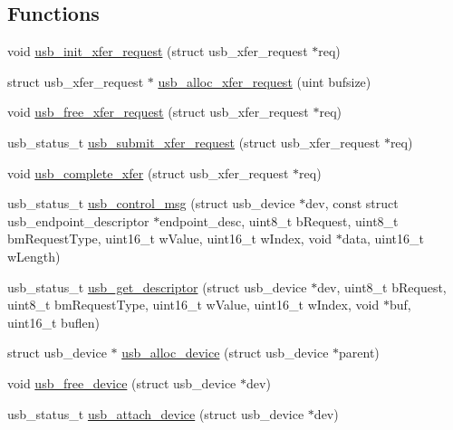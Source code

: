 \subsection*{Functions}
\begin{DoxyCompactItemize}
\item 
void \hyperlink{group__usbcore_ga04500240d93eaedb734240929e5a06be}{usb\-\_\-init\-\_\-xfer\-\_\-request} (struct usb\-\_\-xfer\-\_\-request $\ast$req)
\item 
struct usb\-\_\-xfer\-\_\-request $\ast$ \hyperlink{group__usbcore_ga7daf3baaa97a513d71f323d0f9391fb9}{usb\-\_\-alloc\-\_\-xfer\-\_\-request} (uint bufsize)
\item 
void \hyperlink{group__usbcore_ga4ef47c1a9b0707276d121214cdd461d0}{usb\-\_\-free\-\_\-xfer\-\_\-request} (struct usb\-\_\-xfer\-\_\-request $\ast$req)
\item 
usb\-\_\-status\-\_\-t \hyperlink{group__usbcore_ga873be6d448b1c95c51cb5600a197cf64}{usb\-\_\-submit\-\_\-xfer\-\_\-request} (struct usb\-\_\-xfer\-\_\-request $\ast$req)
\item 
void \hyperlink{group__usbcore_gabf82a9972b273a0e842212e2d638272b}{usb\-\_\-complete\-\_\-xfer} (struct usb\-\_\-xfer\-\_\-request $\ast$req)
\item 
usb\-\_\-status\-\_\-t \hyperlink{group__usbcore_ga0b4d0b3195ae857828f75b9c3f084ff9}{usb\-\_\-control\-\_\-msg} (struct usb\-\_\-device $\ast$dev, const struct usb\-\_\-endpoint\-\_\-descriptor $\ast$endpoint\-\_\-desc, uint8\-\_\-t b\-Request, uint8\-\_\-t bm\-Request\-Type, uint16\-\_\-t w\-Value, uint16\-\_\-t w\-Index, void $\ast$data, uint16\-\_\-t w\-Length)
\item 
usb\-\_\-status\-\_\-t \hyperlink{group__usbcore_ga421272b0f3799410bc7089f29b822c8c}{usb\-\_\-get\-\_\-descriptor} (struct usb\-\_\-device $\ast$dev, uint8\-\_\-t b\-Request, uint8\-\_\-t bm\-Request\-Type, uint16\-\_\-t w\-Value, uint16\-\_\-t w\-Index, void $\ast$buf, uint16\-\_\-t buflen)
\item 
struct usb\-\_\-device $\ast$ \hyperlink{group__usbcore_gaf176c490fcac1b9ec676669f1d235dae}{usb\-\_\-alloc\-\_\-device} (struct usb\-\_\-device $\ast$parent)
\item 
void \hyperlink{group__usbcore_ga1276a0bdafec25f3313ecd6839c51e25}{usb\-\_\-free\-\_\-device} (struct usb\-\_\-device $\ast$dev)
\item 
usb\-\_\-status\-\_\-t \hyperlink{group__usbcore_ga42564b27159fcf3073738ad16e9aa287}{usb\-\_\-attach\-\_\-device} (struct usb\-\_\-device $\ast$dev)
\item 

\end{DoxyCompactItemize}
